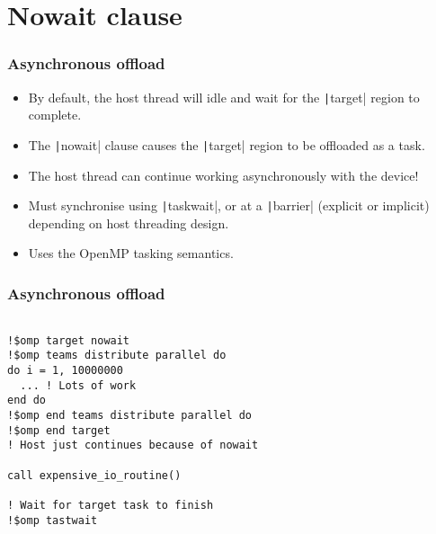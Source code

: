 \documentclass{beamer}
\begin{document}
\section{Nowait clause}
\begin{frame}
\frametitle{Asynchronous offload}
\begin{itemize}
  \item By default, the host thread will idle and wait for the \texttt|target| region to complete.
  \item The \texttt|nowait| clause causes the \texttt|target| region to be offloaded as a task.
  \item The host thread can continue working asynchronously with the device!
  \item Must synchronise using \texttt|taskwait|, or at a \texttt|barrier| (explicit or implicit) depending on host threading design.
  \item Uses the OpenMP tasking semantics.
\end{itemize}
\end{frame}

\begin{frame}[fragile]
\frametitle{Asynchronous offload}
\begin{verbatim}

!$omp target nowait
!$omp teams distribute parallel do
do i = 1, 10000000
  ... ! Lots of work
end do
!$omp end teams distribute parallel do
!$omp end target
! Host just continues because of nowait

call expensive_io_routine()

! Wait for target task to finish
!$omp tastwait

\end{verbatim}
\end{frame}

\end{document}
